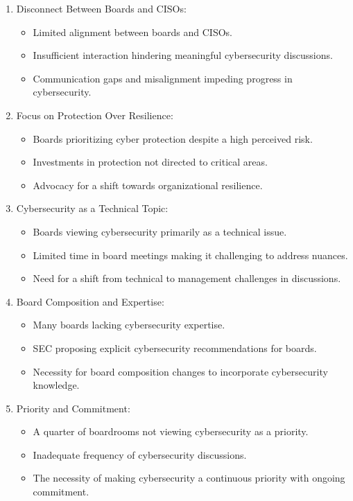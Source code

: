 \begin{enumerate}
\item Disconnect Between Boards and CISOs:
     \begin{itemize}
        \item Limited alignment between boards and CISOs.
        \item Insufficient interaction hindering meaningful cybersecurity discussions.
        \item Communication gaps and misalignment impeding progress in cybersecurity.
     \end{itemize}
 
\item Focus on Protection Over Resilience:
     \begin{itemize}
        \item Boards prioritizing cyber protection despite a high perceived risk.
        \item Investments in protection not directed to critical areas.
        \item Advocacy for a shift towards organizational resilience.
     \end{itemize}
 
\item Cybersecurity as a Technical Topic:
     \begin{itemize}
        \item Boards viewing cybersecurity primarily as a technical issue.
        \item Limited time in board meetings making it challenging to address nuances.
        \item Need for a shift from technical to management challenges in discussions.
     \end{itemize}
 
\item Board Composition and Expertise:
     \begin{itemize}
        \item Many boards lacking cybersecurity expertise.
        \item SEC proposing explicit cybersecurity recommendations for boards.
        \item Necessity for board composition changes to incorporate cybersecurity knowledge.
     \end{itemize}
 
\item Priority and Commitment:
     \begin{itemize}
        \item A quarter of boardrooms not viewing cybersecurity as a priority.
        \item Inadequate frequency of cybersecurity discussions.
        \item The necessity of making cybersecurity a continuous priority with ongoing commitment.
     \end{itemize}
\end{enumerate}

